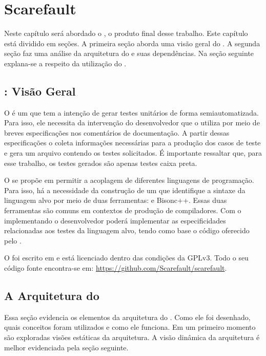 \chapter[Scarefault]{Scarefault}
Neste capítulo será abordado o \Scarefault, o produto final desse
trabalho. Este capítulo está dividido em seções. A primeira seção aborda
uma visão geral do \Scarefault. A segunda seção faz uma análise da
arquitetura do \framework e suas dependências. Na seção seguinte explana-se
a respeito da utilização do \Scarefault.

\section{\Scarefault: Visão Geral}
O \scarefault é um \framework que tem a intenção de gerar testes unitários
de forma semiautomatizada. Para isso, ele necessita da intervenção do
desenvolvedor que o utiliza por meio de breves especificações nos
comentários de documentação. A partir dessas especificações o \scarefault
coleta informações necessárias para a produção dos casos de teste e gera
um arquivo contendo os testes solicitados. É importante ressaltar que,
para esse trabalho, os testes gerados são apenas testes caixa preta.

O \framework se propõe em permitir a acoplagem de diferentes linguagens
de programação. Para isso, há a necessidade da construção de um \parser
que identifique a sintaxe da linguagem alvo por meio de duas
ferramentas: \flexcpp e \textsf{Bisonc++}. Essas duas ferramentas são
comuns em contextos de produção de compiladores. Com o \parser
implementando o desenvolvedor poderá implementar as especificidades
relacionadas aos testes da linguagem alvo, tendo como base o código
oferecido pelo \Scarefault.

O \scarefault foi escrito em \cpp e está licenciado dentro das condições
da \textsf{GPLv3}. Todo o seu código fonte encontra-se em:
\url{https://github.com/Scarefault/scarefault}.

\section{A Arquitetura do \scarefault} \label{sec-arq-scarefault}
Essa seção evidencia os elementos da arquitetura do \Scarefault. Como
ele foi desenhado, quais conceitos foram utilizados e como ele funciona.
Em um primeiro momento são exploradas visões estáticas da arquitetura.
A visão dinâmica da arquitetura é melhor evidenciada pela seção seguinte.

